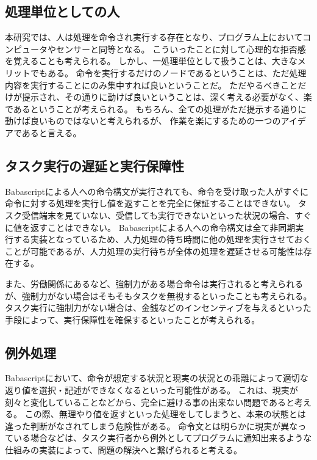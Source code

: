 \documentclass[twoside]{wiss}
\begin{document}
\subsection{処理単位としての人}

本研究では、人は処理を命令され実行する存在となり、プログラム上においてコンピュータやセンサーと同等となる。
こういったことに対して心理的な拒否感を覚えることも考えられる。
しかし、一処理単位として扱うことは、大きなメリットでもある。
命令を実行するだけのノードであるということは、ただ処理内容を実行することにのみ集中すれば良いということだ。
ただやるべきことだけが提示され、その通りに動けば良いということは、深く考える必要がなく、楽であるということが考えられる。
もちろん、全ての処理がただ提示する通りに動けば良いものではないと考えられるが、
作業を楽にするための一つのアイデアであると言える。

\subsection{タスク実行の遅延と実行保障性}

Babascriptによる人への命令構文が実行されても、命令を受け取った人がすぐに命令に対する処理を実行し値を返すことを完全に保証することはできない。
タスク受信端末を見ていない、受信しても実行できないといった状況の場合、すぐに値を返すことはできない。
Babascriptによる人への命令構文は全て非同期実行する実装となっているため、人力処理の待ち時間に他の処理を実行させておくことが可能であるが、人力処理の実行待ちが全体の処理を遅延させる可能性は存在する。

また、労働関係にあるなど、強制力がある場合命令は実行されると考えられるが、強制力がない場合はそもそもタスクを無視するといったことも考えられる。
タスク実行に強制力がない場合は、金銭などのインセンティブを与えるといった手段によって、実行保障性を確保するといったことが考えられる。

\subsection{例外処理}

Babascriptにおいて、命令が想定する状況と現実の状況との乖離によって適切な返り値を選択・記述ができなくなるといった可能性がある。
これは、現実が刻々と変化していることなどから、完全に避ける事の出来ない問題であると考える。
この際、無理やり値を返すといった処理をしてしまうと、本来の状態とは違った判断がなされてしまう危険性がある。
命令文とは明らかに現実が異なっている場合などは、タスク実行者から例外としてプログラムに通知出来るような仕組みの実装によって、問題の解決へと繋げられると考える。
\end{document}
